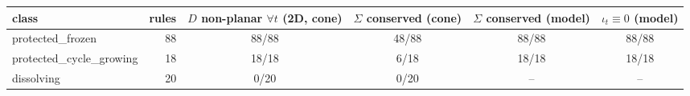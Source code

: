\begin{tabular}{lrcccc}
\toprule
class & rules & $D$ non-planar $\forall t$ (2D, cone) & $\Sigma$ conserved (cone) & $\Sigma$ conserved (model) & $\iota_t\equiv0$ (model)\\
\midrule
protected\_frozen & 88 & 88/88 & 48/88 & 88/88 & 88/88\\
protected\_cycle\_growing & 18 & 18/18 & 6/18 & 18/18 & 18/18\\
dissolving & 20 & 0/20 & 0/20 & -- & --\\
\bottomrule
\end{tabular}
